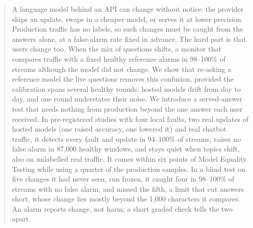 \documentclass{article}
\begin{document}

\printAffiliationsAndNotice{}

\begin{abstract}
A language model behind an API can change without notice: the provider ships an
update, swaps in a cheaper model, or serves it at lower precision. Production
traffic has no labels, so such changes must be caught from the answers alone, at
a false-alarm rate fixed in advance. The hard part is that users change too. When
the mix of questions shifts, a monitor that compares traffic with a fixed healthy
reference alarms in 98--100\% of streams although the model did not change. We
show that re-asking a reference model the live questions removes this confusion,
provided the calibration spans several healthy rounds: hosted models drift from
day to day, and one round understates their noise. We introduce a served-answer
test that needs nothing from production beyond the one answer each user received.
In pre-registered studies with four local faults, two real updates of hosted
models (one raised accuracy, one lowered it) and real chatbot traffic, it detects every
fault and update in 94--100\% of streams, raises no false alarm in 87{,}000
healthy windows, and stays quiet when topics shift, also on unlabelled real
traffic. It comes within six points of Model Equality Testing while using a
quarter of the production samples. In a blind test on five changes it had never
seen, run frozen, it caught four in 98--100\% of streams with no false alarm, and
missed the fifth, a limit that cut answers short, whose change lies mostly
beyond the 1{,}000 characters it compares. An alarm reports change, not harm; a short graded check tells the two
apart.
\end{abstract}
\end{document}

